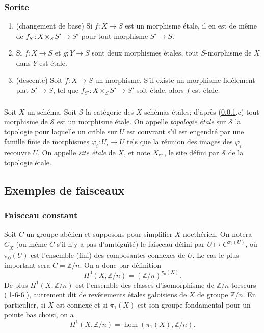 \documentclass{article}
\newcommand{\const}[1]{\underline{#1}}
\newcommand{\et}[1]{{#1}_{\textnormal{et}}}
\newcommand{\cS}{\mathcal{S}}
\newcommand{\dZ}{\mathbb{Z}}
\begin{document}
\subsubsection{Sorite}\label{2-1-3}
\begin{enumerate}[\indent a)]
  \item (changement de base) Si $f:X\to S$ est un morphisme étale, il en est 
    de même de $f_{S'}:X\times_S S'\to S'$ pour tout morphisme $S'\to S$. 
  \item Si $f:X\to S$ et $g:Y\to S$ sont deux morphismes étales, tout 
    $S$-morphisme de $X$ dans $Y$ est étale.
  \item (descente) Soit $f:X\to S$ un morphisme. S'il existe un morphisme 
    fidèlement plat $S'\to S$, tel que $f_{S'}:X\times_S S'\to S'$ soit 
    étale, alors $f$ est étale.
\end{enumerate}





\subsubsection{}\label{2-1-4}

Soit $X$ un schéma. Soit $\cS$ la catégorie des $X$-schémas étales; 
d'après (\ref{2-1-3}.c) tout morphisme de $\cS$ est un morphisme étale. 
On appelle \emph{topologie étale} sur $\cS$ la topologie pour laquelle un 
crible sur $U$ est couvrant s'il est engendré par une famille finie de 
morphismes $\varphi_i:U_i\to U$ tels que la réunion des images des 
$\varphi_i$ recouvre $U$. On appelle \emph{site étale} de $X$, et note 
$\et X$, le site défini par $\cS$ de la topologie étale. 










\subsection{Exemples de faisceaux}\label{2-2}





\subsubsection{Faisceau constant}\label{2-2-1}

Soit $C$ un groupe abélien et supposons pour simplifier $X$ noethérien. On 
notera $\const C_X$ (ou même $C$ s'il n'y a pas d'ambiguïté) le faisceau 
défini par $U\mapsto C^{\pi_0(U)}$, où $\pi_0(U)$ est l'ensemble (fini) des 
composantes connexes de $U$. Le cas le plus important sera $C=\dZ/n$. On a donc 
par définition 
\[
  H^0(X,\dZ/n)=\left(\dZ/n\right)^{\pi_0(X)}\text{.}
\]
De plus $H^1(X,\dZ/n)$ est l'ensemble des classes d'isomorphisme de 
$\dZ/n$-torseurs (\ref{1-6-6}), autrement dit de revêtements étales 
galoisiens de $X$ de groupe $\dZ/n$. En particulier, si $X$ est connexe et si 
$\pi_1(X)$ est son groupe fondamental pour un pointe bas choisi, on a 
\[
  H^1(X,\dZ/n) = \hom(\pi_1(X),\dZ/n)\text{.}
\]
\end{document}

